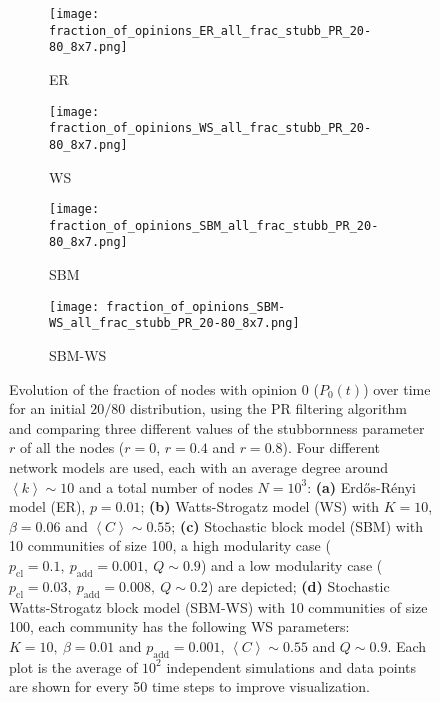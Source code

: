 \documentclass[11 pt , letterpaper , twoside , openright]{book}
\begin{document}
\begin{figure}[H]
  \begin{subfigure}[b]{0.49\textwidth}
  	\texttt{[image: fraction\_of\_opinions\_ER\_all\_frac\_stubb\_PR\_20-80\_8x7.png]}
    \caption{ER}
  \end{subfigure}
  \begin{subfigure}[b]{0.49\textwidth}
  	\texttt{[image: fraction\_of\_opinions\_WS\_all\_frac\_stubb\_PR\_20-80\_8x7.png]}
    \caption{WS}
  \end{subfigure}
  \begin{subfigure}[b]{0.49\textwidth}
    \texttt{[image: fraction\_of\_opinions\_SBM\_all\_frac\_stubb\_PR\_20-80\_8x7.png]}
    \caption{SBM}
  \end{subfigure}
  \begin{subfigure}[b]{0.49\textwidth}
    \texttt{[image: fraction\_of\_opinions\_SBM-WS\_all\_frac\_stubb\_PR\_20-80\_8x7.png]}
    \caption{SBM-WS}
  \end{subfigure}
  \captionsetup{format=plain}
  \caption[Evolution of the fraction of nodes with opinion 0 ($P_0(t)$) over time for an initial $20/80$ opinion distribution, using the PR filtering algorithm and comparing three different values of the stubbornness parameter $r$ of all the nodes ($r = 0$, $r = 0.4$ and $r = 0.8$).]{Evolution of the fraction of nodes with opinion 0 ($P_0(t)$) over time for an initial $20/80$ distribution, using the PR filtering algorithm and comparing three different values of the stubbornness parameter $r$ of all the nodes ($r = 0$, $r = 0.4$ and $r = 0.8$). Four different network models are used, each with an average degree around $\left<k\right> \sim 10$ and a total number of nodes $N = 10^3$: \textbf{(a)} Erd\H{o}s-R\'{e}nyi model (ER), $p=0.01$; \textbf{(b)} Watts-Strogatz model (WS) with $K = 10$, $\beta = 0.06$ and $\left<C\right> \sim 0.55$; \textbf{(c)} Stochastic block model (SBM) with 10 communities of size 100, a high modularity case ($p_{\text{cl}} = 0.1,\ p_{\text{add}} = 0.001,\ Q \sim 0.9$) and a low modularity case ($p_{\text{cl}} = 0.03,\ p_{\text{add}} = 0.008,\ Q \sim 0.2$) are depicted; \textbf{(d)} Stochastic Watts-Strogatz block model (SBM-WS) with 10 communities of size 100, each community has the following WS parameters: $K = 10,\ \beta = 0.01$ and $p_{\text{add}} = 0.001$, $\left<C\right> \sim 0.55$ and $Q \sim 0.9$. Each plot is the average of $10^2$ independent simulations and data points are shown for every 50 time steps to improve visualization.}%
\label{ev_op_20_80_all_frac_stubb_PR}
\end{figure}
\end{document}
